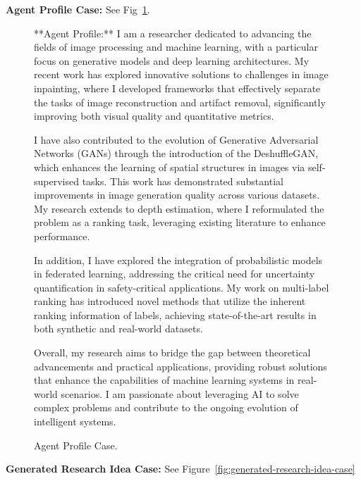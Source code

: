 \textbf{Agent Profile Case:} See Fig~\ref{fig:agent-profile-case}.
\begin{figure}[htbp]
\centering
\begin{tcolorbox}[colback=yellow!2!white, colframe=gray!50!yellow]
\begin{minipage}{\linewidth}
\small
**Agent Profile:**
I am a researcher dedicated to advancing the fields of image processing and machine learning, with a particular focus on generative models and deep learning architectures. My recent work has explored innovative solutions to challenges in image inpainting, where I developed frameworks that effectively separate the tasks of image reconstruction and artifact removal, significantly improving both visual quality and quantitative metrics.

I have also contributed to the evolution of Generative Adversarial Networks (GANs) through the introduction of the DeshuffleGAN, which enhances the learning of spatial structures in images via self-supervised tasks. This work has demonstrated substantial improvements in image generation quality across various datasets. My research extends to depth estimation, where I reformulated the problem as a ranking task, leveraging existing literature to enhance performance.

In addition, I have explored the integration of probabilistic models in federated learning, addressing the critical need for uncertainty quantification in safety-critical applications. My work on multi-label ranking has introduced novel methods that utilize the inherent ranking information of labels, achieving state-of-the-art results in both synthetic and real-world datasets.

Overall, my research aims to bridge the gap between theoretical advancements and practical applications, providing robust solutions that enhance the capabilities of machine learning systems in real-world scenarios. I am passionate about leveraging AI to solve complex problems and contribute to the ongoing evolution of intelligent systems.
\end{minipage}
\end{tcolorbox}
\caption{Agent Profile Case.}
\label{fig:agent-profile-case}
\end{figure}

\textbf{Generated Research Idea Case:} See Figure~\ref{fig:generated-research-idea-case}

